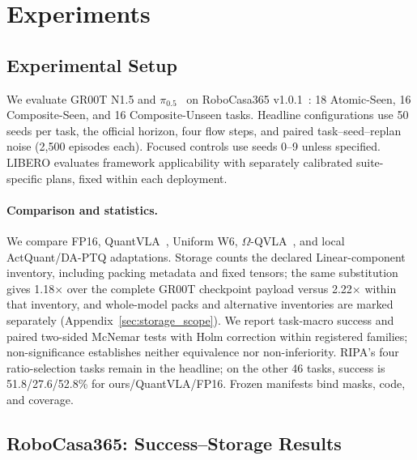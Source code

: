 \section{Experiments}
\label{sec:experiments}

\subsection{Experimental Setup}
\label{sec:setup}

We evaluate GR00T N1.5 and $\pi_{0.5}$~\citep{bjorck2025groot,intelligence2025pi05} on RoboCasa365 v1.0.1~\citep{nasiriany2026robocasa365}: 18 Atomic-Seen, 16 Composite-Seen, and 16 Composite-Unseen tasks. Headline configurations use 50 seeds per task, the official horizon, four flow steps, and paired task--seed--replan noise (2,500 episodes each). Focused controls use seeds 0--9 unless specified. LIBERO evaluates framework applicability with separately calibrated suite-specific plans, fixed within each deployment.

\paragraph{Comparison and statistics.}
We compare FP16, QuantVLA~\citep{zhang2026quantvla}, Uniform W6, $\Omega$-QVLA~\citep{wang2026omegaqvla}, and local ActQuant/DA-PTQ adaptations. Storage counts the declared Linear-component inventory, including packing metadata and fixed tensors; the same substitution gives 1.18$\times$ over the complete GR00T checkpoint payload versus 2.22$\times$ within that inventory, and whole-model packs and alternative inventories are marked separately (Appendix~\ref{sec:storage_scope}). We report task-macro success and paired two-sided McNemar tests with Holm correction within registered families; non-significance establishes neither equivalence nor non-inferiority. RIPA's four ratio-selection tasks remain in the headline; on the other 46 tasks, success is 51.8/27.6/52.8\% for ours/QuantVLA/FP16. Frozen manifests bind masks, code, and coverage.

\subsection{RoboCasa365: Success--Storage Results}
\label{sec:main_results}




